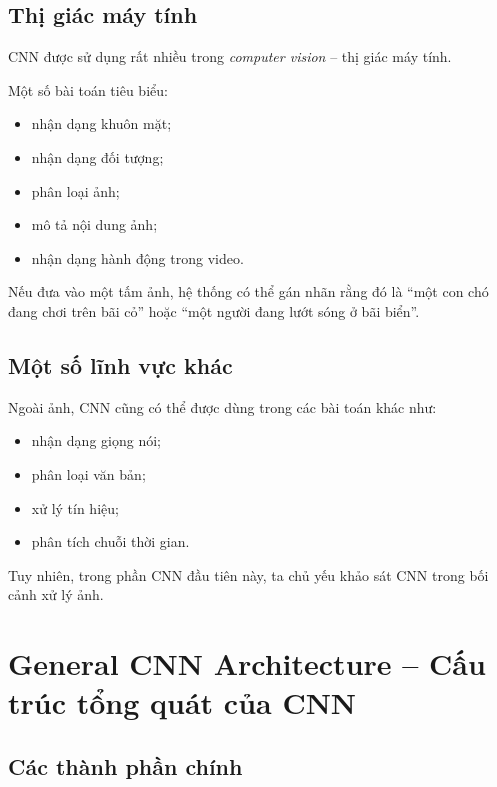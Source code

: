 \subsection{Thị giác máy tính}

CNN được sử dụng rất nhiều trong \textit{computer vision} -- thị giác máy tính.

Một số bài toán tiêu biểu:

\begin{itemize}
    \item nhận dạng khuôn mặt;
    \item nhận dạng đối tượng;
    \item phân loại ảnh;
    \item mô tả nội dung ảnh;
    \item nhận dạng hành động trong video.
\end{itemize}

\begin{vidu}
Nếu đưa vào một tấm ảnh, hệ thống có thể gán nhãn rằng đó là ``một con chó đang chơi trên bãi cỏ'' hoặc ``một người đang lướt sóng ở bãi biển''.
\end{vidu}

\subsection{Một số lĩnh vực khác}

Ngoài ảnh, CNN cũng có thể được dùng trong các bài toán khác như:

\begin{itemize}
    \item nhận dạng giọng nói;
    \item phân loại văn bản;
    \item xử lý tín hiệu;
    \item phân tích chuỗi thời gian.
\end{itemize}

Tuy nhiên, trong phần CNN đầu tiên này, ta chủ yếu khảo sát CNN trong bối cảnh xử lý ảnh.

\section{General CNN Architecture -- Cấu trúc tổng quát của CNN}

\subsection{Các thành phần chính}

